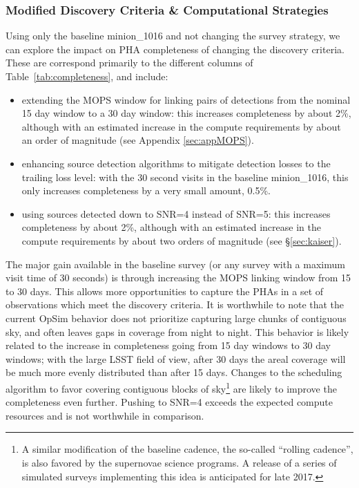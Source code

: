 \subsubsection{Modified Discovery Criteria \& Computational Strategies}

Using only the baseline minion\_1016 and not changing the survey strategy, we can explore the impact on PHA completeness of changing the discovery criteria. These are correspond primarily to the different columns of Table~\ref{tab:completeness}, and include:

\begin{itemize}
\item extending the MOPS window for linking pairs of detections from the nominal 15 day window to a 30 day window: this increases completeness by about 2\%, although with an estimated increase in the compute requirements by about an order of magnitude (see Appendix \ref{sec:appMOPS}).
\item enhancing source detection algorithms to mitigate detection losses to the trailing loss level: with the 30 second visits in the baseline minion\_1016, this only increases completeness by a very small amount, 0.5\%.
\item using sources detected down to SNR=4 instead of SNR=5: this increases completeness by about 2\%, although with an estimated increase in the compute requirements by about two orders of magnitude (see \S\ref{sec:kaiser}).
\end{itemize}

The major gain available in the baseline survey (or any survey with a maximum visit time of 30 seconds) is through increasing the MOPS linking window from 15 to 30 days. This allows more opportunities to capture the PHAs in a set of observations which meet the discovery criteria. It is worthwhile to note that the current OpSim behavior does not prioritize capturing large chunks of contiguous sky, and often leaves gaps in coverage from night to night. This behavior is likely related to the increase in completeness going from 15 day windows to 30 day windows; with the large LSST field of view, after 30 days the areal coverage will be much more evenly distributed than after 15 days. Changes to the scheduling algorithm to favor covering contiguous blocks of sky\footnote{A similar modification of
the baseline cadence, the so-called ``rolling cadence'', is also favored by the supernovae science programs. A release of a series of simulated surveys implementing this idea is anticipated for late 2017.} are likely to improve the completeness even further.  Pushing to SNR=4 exceeds the expected compute resources and is not worthwhile in comparison.


